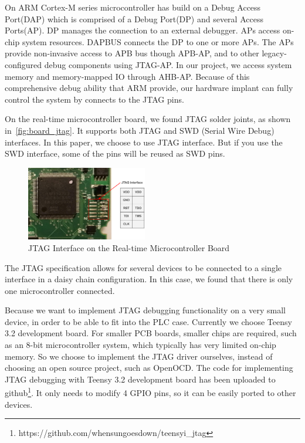 On ARM Cortex-M series microcontroller has build on a Debug Access Port(DAP) which is comprised of a Debug Port(DP) and several Access Ports(AP). DP manages the connection to an external debugger. APs access on-chip system resources. DAPBUS connects the DP to one or more APs. The APs provide non-invasive access to APB bus though APB-AP,  and to other legacy-configured debug components using JTAG-AP. In our project, we access system memory and memory-mapped IO through AHB-AP. Because of this comprehensive debug ability that ARM provide, our hardware implant can fully control the system by connects to the JTAG pins.

On the real-time microcontroller board, we found JTAG solder joints, as shown in~\autoref{fig:board_jtag}. It supports both JTAG and SWD (Serial Wire Debug\cite{ashfieldserial}) interfaces. In this paper, we choose to use JTAG interface. But if you use the SWD interface, some of the pins will be reused as SWD pins. 

\begin{figure}[th]
	\includegraphics[width=0.47\textwidth]{figures/board_jtag}
	\centering
	\caption{JTAG Interface on the Real-time Microcontroller Board}
	\label{fig:board_jtag}
\end{figure}

The JTAG specification allows for several devices to be connected to a single interface in a daisy chain configuration. In this case, we found that there is only one microcontroller connected.

Because we want to implement JTAG debugging functionality on a very small device, in order to be able to fit into the PLC case. Currently we choose Teensy 3.2 development board. For smaller PCB boards, smaller chips are required, such as an 8-bit microcontroller system, which typically has very limited on-chip memory. So we choose to implement the JTAG driver ourselves, instead of choosing an open source project, such as OpenOCD\cite{hogl2006open}. The code for implementing JTAG debugging with Teensy 3.2 development board has been uploaded to github\footnote{https://github.com/whensungoesdown/teensyi\_jtag}. It only needs to modify 4 GPIO pins, so it can be easily ported to other devices.
